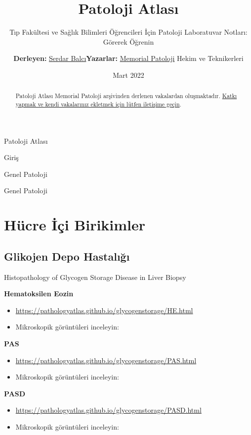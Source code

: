 \documentclass[
  letterpaper,
  DIV=11,
  numbers=noendperiod]{scrreprt}
\title{Patoloji Atlası}
\subtitle{Tıp Fakültesi ve Sağlık Bilimleri Öğrencileri İçin Patoloji
Laboratuvar Notları: Görerek Öğrenin}
\author{\begin{itemize}
\tightlist
\item
  \textbf{Derleyen:} \href{https://www.serdarbalci.com}{Serdar Balcı}
\item
  \textbf{Yazarlar:} \href{https://MemorialPath.github.io}{Memorial
  Patoloji} Hekim ve Teknikerleri
\end{itemize}}
\date{Mart 2022}
\renewcommand*\contentsname{Table of contents}
\begin{document}
\maketitle
\begin{abstract}
Patoloji Atlası Memorial Patoloji arşivinden derlenen vakalardan
oluşmaktadır. \href{katki.qmd}{Katkı yapmak ve kendi vakalarınız
ekletmek için lütfen iletişime geçin}.
\end{abstract}

\renewcommand*\contentsname{Table of contents}
{
\hypersetup{linkcolor=}
\setcounter{tocdepth}{2}
\tableofcontents
}
Patoloji Atlası

Giriş

Genel Patoloji

Genel Patoloji

\hypertarget{huxfccre-iuxe7i-birikimler}{%
\chapter{Hücre İçi Birikimler}\label{huxfccre-iuxe7i-birikimler}}

\hypertarget{glikojen-depo-hastalux131ux11fux131}{%
\section{Glikojen Depo
Hastalığı}\label{glikojen-depo-hastalux131ux11fux131}}

Histopathology of Glycogen Storage Disease in Liver Biopsy

\textbf{Hematoksilen Eozin}

\begin{itemize}
\item
  \url{https://pathologyatlas.github.io/glycogenstorage/HE.html}
\item
  Mikroskopik görüntüleri inceleyin:
\end{itemize}

\textbf{PAS}

\begin{itemize}
\item
  \url{https://pathologyatlas.github.io/glycogenstorage/PAS.html}
\item
  Mikroskopik görüntüleri inceleyin:
\end{itemize}

\textbf{PASD}

\begin{itemize}
\item
  \url{https://pathologyatlas.github.io/glycogenstorage/PASD.html}
\item
  Mikroskopik görüntüleri inceleyin:
\end{itemize}
\end{document}
